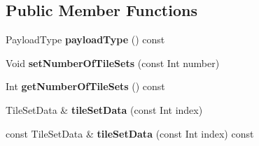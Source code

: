 \subsection*{Public Member Functions}
\begin{DoxyCompactItemize}
\item 
\mbox{\label{class_s_e_i_temp_motion_constrained_tile_sets_a1725cfeef1515476d01658469fc22980}} 
Payload\+Type {\bfseries payload\+Type} () const
\item 
\mbox{\label{class_s_e_i_temp_motion_constrained_tile_sets_a53c85041672f2248b4c3eabe007db61a}} 
Void {\bfseries set\+Number\+Of\+Tile\+Sets} (const Int number)
\item 
\mbox{\label{class_s_e_i_temp_motion_constrained_tile_sets_a1f88dec5a3d85eb0daa7db3f2330ef6d}} 
Int {\bfseries get\+Number\+Of\+Tile\+Sets} () const
\item 
\mbox{\label{class_s_e_i_temp_motion_constrained_tile_sets_ae7d8d2dfb5ea6fe2e2984a8967881f5f}} 
Tile\+Set\+Data \& {\bfseries tile\+Set\+Data} (const Int index)
\item 
\mbox{\label{class_s_e_i_temp_motion_constrained_tile_sets_afdcedcc316ebdc1324c8d53922f2f923}} 
const Tile\+Set\+Data \& {\bfseries tile\+Set\+Data} (const Int index) const
\end{DoxyCompactItemize}
